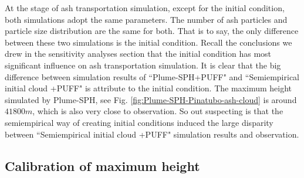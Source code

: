 At the stage of ash transportation simulation, except for the initial condition, both simulations adopt the same parameters. The number of ash particles and particle size distribution are the same for both. That is to say, the only difference between these two simulations is the initial condition. Recall the conclusions we drew in the sensitivity analyses section that the initial condition has most significant influence on ash transportation simulation. It is clear that the big difference between simulation results of ``Plume-SPH+PUFF" and ``Semiempirical initial cloud +PUFF" is attribute to the initial condition.
The maximum height simulated by Plume-SPH, see Fig. \ref{fig:Plume-SPH-Pinatubo-ash-cloud} is around $41800 m$, which is also very close to observation. So out suspecting is that the semiempirical way of creating initial conditions induced the large disparity between ``Semiempirical initial cloud +PUFF" simulation results and observation.

\subsection{Calibration of maximum height}

